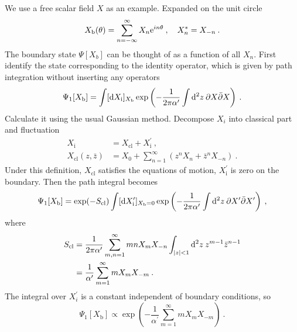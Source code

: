 We use a free scalar field $X$ as an example.    
Expanded on the unit circle    
\begin{equation}
	X_{\mathrm{b}}(\theta)=\sum_{n=-\infty}^{\infty} X_{n} \mathrm{e}^{i n \theta} \:, \quad X_{n}^{*}=X_{-n} \:. \label{2.8.19}
\end{equation}
The boundary state $\Psi[X_b]$ can be thought of as a function of all $X_n$.    
First identify the state corresponding to the identity operator, which is given by path integration without inserting any operators    
\begin{equation}
	\Psi_{1}[X_{\mathrm{b}}] = \int [\mathrm{d} X_{\mathrm{i}}]_{X_{\mathrm{b}}} \exp \left(-\frac{1}{2 \pi \alpha^{\prime}} 
	\int \mathrm{d}^{2} z\: \partial X \bar{\partial} X\right) \:. \label{2.8.20}
\end{equation}
Calculate it using the usual Gaussian method.    
Decompose $X_i$ into classical part and fluctuation    
\begin{subequations} \label{2.8.21}
	\begin{align}
		X_{\mathrm{i}}&=X_{\mathrm{cl}}+X_{\mathrm{i}}^{\prime} \:,\label{2.8.21a} \\
		X_{\mathrm{cl}}(z, \bar{z})&=X_{0}+\sum_{n=1}^{\infty}\left(z^{n} X_{n}+\bar{z}^{n} X_{-n}\right)  \:. \label{2.8.21b}
	\end{align}
\end{subequations}
Under this definition, $X_{\text{cl}}$ satisfies the equations of motion, $X_{\text{i}}^\prime$ is zero on the boundary.    
Then the path integral becomes    
\begin{equation}
	\Psi_{1}[X_{\mathrm{b}}]=\exp (-S_{\mathrm{cl}}) \int [\mathrm{d} X_{\mathrm{i}}^{\prime}]_{X_{\mathrm{b}}=0} 
	\exp \left(-\frac{1}{2 \pi \alpha^{\prime}} \int \mathrm{d}^{2} z\: \partial X^{\prime} \bar{\partial} X^{\prime}\right) \:,
	\label{2.8.22}
\end{equation}
where    
\begin{align}
	S_{\mathrm{cl}} &=\frac{1}{2 \pi \alpha^{\prime}} \sum_{m, n=1}^{\infty} m n X_{m} X_{-n} 
	\int_{|z|<1} \mathrm{d}^{2} z\: z^{m-1} \bar{z}^{n-1}  \nonumber \\
	&=\frac{1}{\alpha^{\prime}} \sum_{m=1}^{\infty} m X_{m} X_{-m} \:.
	\label{2.8.23}
\end{align}
The integral over $X_i^\prime$ is a constant independent of boundary conditions, so    
\begin{equation}\label{2.8.24}
	\Psi_{1}[X_{\mathrm{b}}] \propto \exp \left(-\frac{1}{\alpha^{\prime}} \sum_{m=1}^{\infty} m X_{m} X_{-m}\right) \:.
\end{equation}
